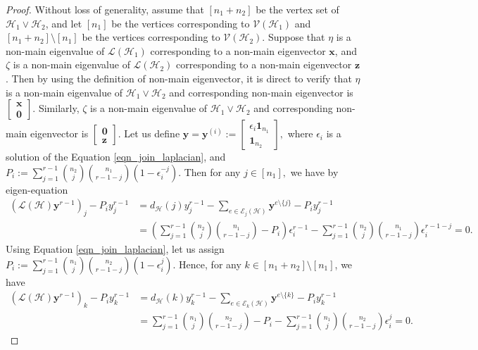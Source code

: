 \documentclass[10pt,a4paper]{article}
\begin{document}
	\begin{proof}
		Without loss of generality, assume that $[n_1+n_2]$ be the vertex set of $\mathcal{H}_1 \vee \mathcal{H}_2$, and let $[n_1]$ be the vertices corresponding to $\mathcal{V}(\mathcal{H}_1)$ and $[n_1 + n_2] \setminus [n_1]$ be the vertices corresponding to $\mathcal{V}(\mathcal{H}_2)$. 
		Suppose that $\eta$ is a non-main eigenvalue of $\mathcal{L}(\mathcal{H}_1)$ corresponding to a non-main eigenvector $\mathbf{x}$, and $\zeta$ is a non-main eigenvalue of $\mathcal{L}(\mathcal{H}_2)$ corresponding to a non-main eigenvector $\mathbf{z}$. 
		Then by using the definition of non-main eigenvector, it is direct to verify that $\eta$ is a non-main eigenvalue of $\mathcal{H}_1 \vee \mathcal{H}_2$ and corresponding non-main eigenvector is 
		$\left[\begin{matrix}
			\mathbf{x}\\
			\mathbf{0}
		\end{matrix} \right]$.
		Similarly,  $\zeta$ is a non-main eigenvalue of $\mathcal{H}_1 \vee \mathcal{H}_2$ and corresponding non-main eigenvector is 
		$\left[\begin{matrix}
			\mathbf{0}\\
			\mathbf{z}
		\end{matrix} \right]$.
		Let us define $\mathbf{y}=\mathbf{y}^{(i)}:=
		\left[ \begin{matrix}
			\epsilon_i \mathbf{1}_{n_1} \\
			\mathbf{1}_{n_2}
		\end{matrix} \right],$ where $\epsilon_i$ is a solution of the Equation \ref{eqn_join_laplacian}, and $P_i := \sum\limits_{j=1}^{r-1} \binom{n_2}{j}\binom{n_1}{r-1-j} (1-\epsilon_i^{-j})$. 
		Then for any $j \in [n_1],$ we have by eigen-equation
		\begin{align*}
			(\mathcal{L}(\mathcal{H}) \mathbf{y}^{r-1})_j - P_i y_j^{r-1} 
			&= d_{\mathcal{H}}(j) y_j^{r-1} - \sum\limits_{e \in \mathcal{E}_j(\mathcal{H})} \mathbf{y}^{e \setminus \{j \}}  - P_i y_j^{r-1}\\
			&=\left(\sum\limits_{j=1}^{r-1} \binom{n_2}{j}\binom{n_1}{r-1-j} - P_i \right)\epsilon_i^{r-1} - \sum\limits_{j=1}^{r-1} \binom{n_2}{j} \binom{n_1}{r-1-j} \epsilon_i^{r-1-j} = 0. 
		\end{align*}
		Using Equation \ref{eqn_join_laplacian}, let us assign $P_i:=\sum\limits_{j=1}^{r-1} \binom{n_1}{j}\binom{n_2}{r-1-j} (1-\epsilon_i^{j}).$ Hence, for any $k \in [n_1+n_2]\setminus [n_1]$, we have
		\begin{align*}
			(\mathcal{L}(\mathcal{H})\mathbf{y}^{r-1})_k - P_iy_k^{r-1} &= d_{\mathcal{H}}(k) y_k^{r-1} - \sum\limits_{ e \in \mathcal{E}_k(\mathcal{H})} \mathbf{y}^{e \setminus \{k \} } - P_i y_k^{r-1} \\
			&=\sum\limits_{j=1}^{r-1} \binom{n_1}{j} \binom{n_2}{r-1-j} - P_i - \sum\limits_{j=1}^{r-1} \binom{n_1}{j} \binom{n_2}{r-1-j} \epsilon_i^j=0. 
		\end{align*}
	\end{proof}
	
\end{document}
